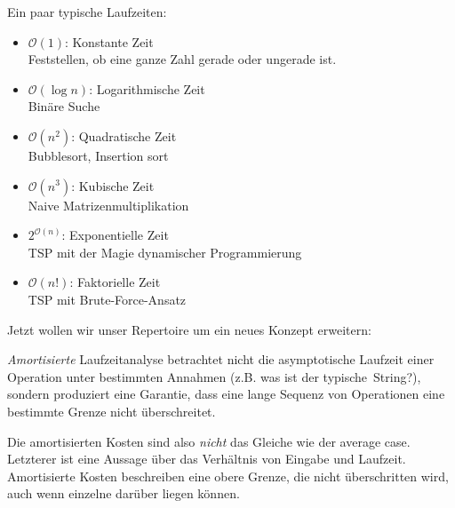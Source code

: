 \documentclass{beamer}
\begin{document}


\begin{frame}
Ein paar typische Laufzeiten:

\begin{itemize}
\item $\mathcal{O}(1)$: Konstante Zeit\\
Feststellen, ob eine ganze Zahl gerade oder ungerade ist.\pause
\item $\mathcal{O}(\log{}n)$: Logarithmische Zeit\\
Binäre Suche\pause
\item $\mathcal{O}(n^2)$: Quadratische Zeit\\
Bubblesort, Insertion sort\pause
\item $\mathcal{O}(n^3)$: Kubische Zeit\\
Naive Matrizenmultiplikation\pause
\item $2^{\mathcal{O}(n)}$: Exponentielle Zeit\\
TSP mit der Magie dynamischer Programmierung\pause
\item $\mathcal{O}(n!)$: Faktorielle Zeit\\
TSP mit Brute-Force-Ansatz
\end{itemize}
\end{frame}


\begin{frame}
Jetzt wollen wir unser Repertoire um ein neues Konzept erweitern:\smallskip\smallskip

\emph{Amortisierte} Laufzeitanalyse betrachtet nicht die asymptotische Laufzeit einer Operation unter bestimmten Annahmen (z.B. was ist der \glqq typische\grqq\ String?), sondern 
produziert eine Garantie, dass eine lange Sequenz von Operationen eine bestimmte Grenze nicht überschreitet.\pause\bigskip

Die amortisierten Kosten sind also \emph{nicht} das Gleiche wie der average case. Letzterer ist eine Aussage über das Verhältnis von Eingabe und Laufzeit. Amortisierte Kosten beschreiben eine obere Grenze, die nicht überschritten wird, auch wenn einzelne darüber liegen können.
\end{frame}

\end{document}

